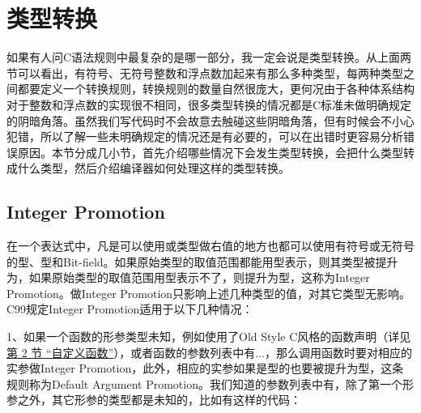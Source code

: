


\section{类型转换}
%
如果有人问C语法规则中最复杂的是哪一部分，我一定会说是类型转换。从上面两节可以看出，有符号、无符号整数和浮点数加起来有那么多种类型，每两种类型之间都要定义一个转换规则，转换规则的数量自然很庞大，更何况由于各种体系结构对于整数和浮点数的实现很不相同，很多类型转换的情况都是C标准未做明确规定的阴暗角落。虽然我们写代码时不会故意去触碰这些阴暗角落，但有时候会不小心犯错，所以了解一些未明确规定的情况还是有必要的，可以在出错时更容易分析错误原因。本节分成几小节，首先介绍哪些情况下会发生类型转换，会把什么类型转成什么类型，然后介绍编译器如何处理这样的类型转换。


\subsection{Integer Promotion}
%


在一个表达式中，凡是可以使用或类型做右值的地方也都可以使用有符号或无符号的型、型和Bit-field。如果原始类型的取值范围都能用型表示，则其类型被提升为，如果原始类型的取值范围用型表示不了，则提升为型，这称为Integer Promotion。做Integer Promotion只影响上述几种类型的值，对其它类型无影响。C99规定Integer Promotion适用于以下几种情况：



1、如果一个函数的形参类型未知，例如使用了Old Style C风格的函数声明（详见\hyperlink{db.ch03s02.id2712975}{第 2 节 “自定义函数”}），或者函数的参数列表中有...，那么调用函数时要对相应的实参做Integer Promotion，此外，相应的实参如果是型的也要被提升为型，这条规则称为Default Argument Promotion。我们知道的参数列表中有，除了第一个形参之外，其它形参的类型都是未知的，比如有这样的代码：




